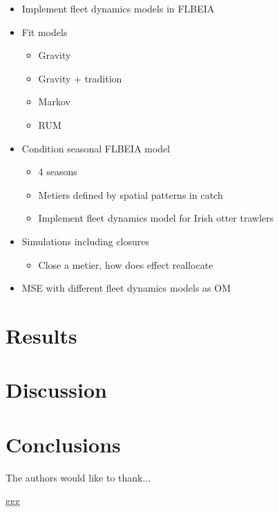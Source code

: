 \documentclass[12pt, halfline, a4paper]{ouparticle}
\begin{document}
\begin{itemize}
	\item Implement fleet dynamics models in FLBEIA
	\item Fit models
		\begin{itemize}
			\item Gravity
			\item Gravity + tradition
			\item Markov
			\item RUM
		\end{itemize}
	\item Condition seasonal FLBEIA model
		\begin{itemize}
			\item 4 seasons
			\item Metiers defined by spatial patterns in catch
			\item Implement fleet dynamics model for Irish otter
				trawlers
		\end{itemize}
	\item Simulations including closures
		\begin{itemize}
			\item Close a metier, how does effect reallocate
		\end{itemize}
	\item MSE with different fleet dynamics models as OM
\end{itemize}

\section{Results}
\label{res}

\section{Discussion}
\label{dis}

\section{Conclusions}
\label{con}


\begin{notes}[Acknowledgements]
The authors would like to thank...
\end{notes}

\begin{thebibliography}
ggg
\end{thebibliography}


\newpage
\end{document}
